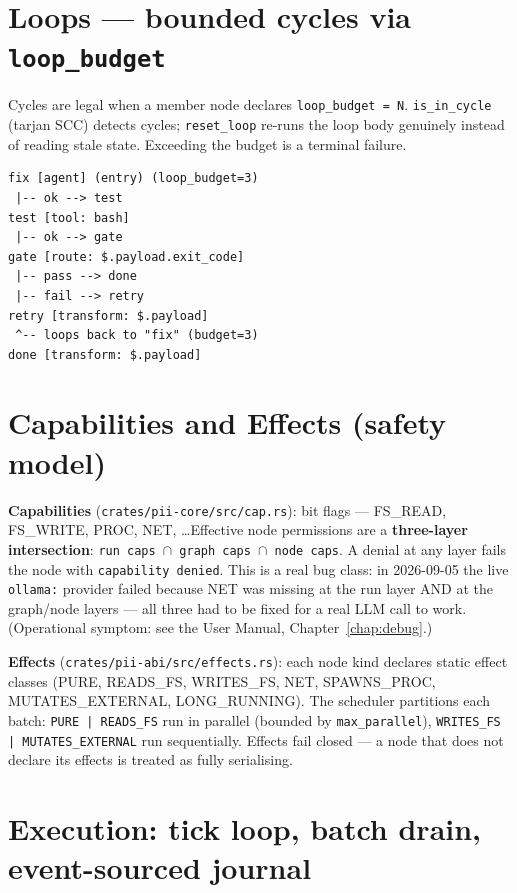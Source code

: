 \documentclass[
	fontsize=10pt,
	twoside=false,
	secnumdepth=2,
	open=any,
]{kaobook}
\begin{document}
\section{Loops — bounded cycles via \texttt{loop\_budget}}

Cycles are legal when a member node declares \texttt{loop\_budget = N}.
\texttt{is\_in\_cycle} (tarjan SCC) detects cycles; \texttt{reset\_loop}
re-runs the loop body genuinely instead of reading stale state. Exceeding
the budget is a terminal failure.

\begin{lstlisting}
fix [agent] (entry) (loop_budget=3)
 |-- ok --> test
test [tool: bash]
 |-- ok --> gate
gate [route: $.payload.exit_code]
 |-- pass --> done
 |-- fail --> retry
retry [transform: $.payload]
 ^-- loops back to "fix" (budget=3)
done [transform: $.payload]
\end{lstlisting}

\section{Capabilities and Effects (safety model)}

\textbf{Capabilities} (\texttt{crates/pii-core/src/cap.rs}): bit flags —
FS\_READ, FS\_WRITE, PROC, NET, \ldots Effective node permissions are a
\textbf{three-layer intersection}: \texttt{run caps $\cap$ graph caps
$\cap$ node caps}. A denial at any layer fails the node with
\texttt{capability denied}. This is a real bug class: in 2026-09-05 the
live \texttt{ollama:} provider failed because NET was missing at the run
layer AND at the graph/node layers — all three had to be fixed for a real
LLM call to work. (Operational symptom: see the User Manual,
Chapter~\ref{chap:debug}.)

\textbf{Effects} (\texttt{crates/pii-abi/src/effects.rs}): each node kind
declares static effect classes (PURE, READS\_FS, WRITES\_FS, NET,
SPAWNS\_PROC, MUTATES\_EXTERNAL, LONG\_RUNNING). The scheduler partitions
each batch: \texttt{PURE | READS\_FS} run in parallel (bounded by
\texttt{max\_parallel}), \texttt{WRITES\_FS | MUTATES\_EXTERNAL} run
sequentially. Effects fail closed — a node that does not declare its
effects is treated as fully serialising.

\section{Execution: tick loop, batch drain, event-sourced journal}
\end{document}
